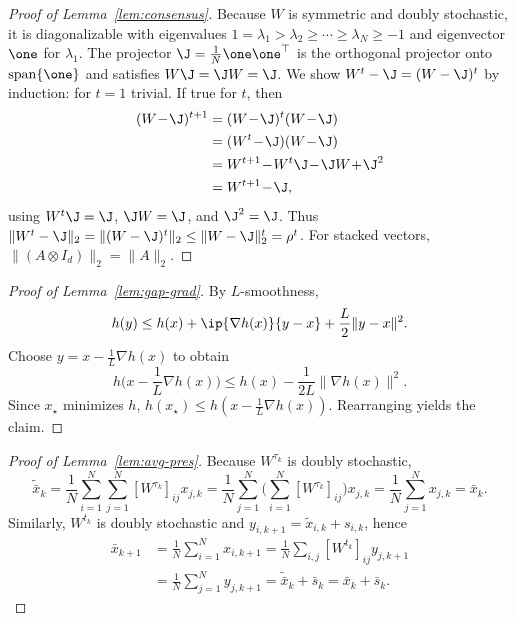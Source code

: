 \documentclass[review,onefignum,onetabnum]{siamart171218}
\begin{document}
	\begin{proof}[Proof of Lemma~\ref{lem:consensus}]
		Because $W$ is symmetric and doubly stochastic, it is diagonalizable with eigenvalues
		$1=\lambda_1>\lambda_2\ge\cdots\ge\lambda_N\ge -1$ and eigenvector $\one$ for $\lambda_1$.
		The projector $\J=\frac1N\one\one^\top$ is the orthogonal projector onto $\mathrm{span}\{\one\}$ and satisfies $W\J=\J W=\J$.
		We show $W^t-\J=(W-\J)^t$ by induction: for $t=1$ trivial. If true for $t$, then
		\begin{align*}
			(W\!-\!\J)^{t+1}&=(W\!-\!\J)^t(W\!-\!\J)\\
			&=(W^t\!-\!\J)(W\!-\!\J)\\
			&=W^{t+1}\!-\!W^t\J\!-\!\J W\!+\!\J^2\\
			&=W^{t+1}\!-\!\J,
		\end{align*}
		using $W^t\J=\J$, $\J W=\J$, and $\J^2=\J$.
		Thus $\|W^t-\J\|_2=\|(W-\J)^t\|_2\le \|W-\J\|_2^t=\rho^t$.
		For stacked vectors, $\|(A\otimes I_d)\|_2=\|A\|_2$.
	\end{proof}
	
	\begin{proof}[Proof of Lemma~\ref{lem:gap-grad}]
		By $L$-smoothness,
		\[
		h(y)\le h(x)+\ip{\nabla h(x)}{y-x}+\frac{L}{2}\|y-x\|^2.
		\]
		Choose $y=x-\frac1L\nabla h(x)$ to obtain
		\[
		h\Big(x-\frac1L\nabla h(x)\Big)\le h(x)-\frac{1}{2L}\|\nabla h(x)\|^2.
		\]
		Since $x_\star$ minimizes $h$, $h(x_\star)\le h(x-\frac1L\nabla h(x))$. Rearranging yields the claim.
	\end{proof}
	
	\begin{proof}[Proof of Lemma~\ref{lem:avg-pres}]
		Because $W^{\tau_k}$ is doubly stochastic,
		\[
		\tilde{\bar x}_k=\frac1N\sum_{i=1}^N\sum_{j=1}^N [W^{\tau_k}]_{ij}x_{j,k}
		=\frac1N\sum_{j=1}^N\Big(\sum_{i=1}^N [W^{\tau_k}]_{ij}\Big)x_{j,k}
		=\frac1N\sum_{j=1}^N x_{j,k}=\bar x_k.
		\]
		Similarly, $W^{t_k}$ is doubly stochastic and $y_{i,k+1}=\tilde x_{i,k}+s_{i,k}$, hence
		\begin{align*}
			\bar x_{k+1}
			&=\tfrac1N\textstyle\sum_{i=1}^N x_{i,k+1}
			=\tfrac1N\textstyle\sum_{i,j} [W^{t_k}]_{ij}y_{j,k+1}\\
			&=\tfrac1N\textstyle\sum_{j=1}^N y_{j,k+1}
			=\tilde{\bar x}_k+\bar s_k=\bar x_k+\bar s_k.
		\end{align*}
	\end{proof}
	
\end{document}
